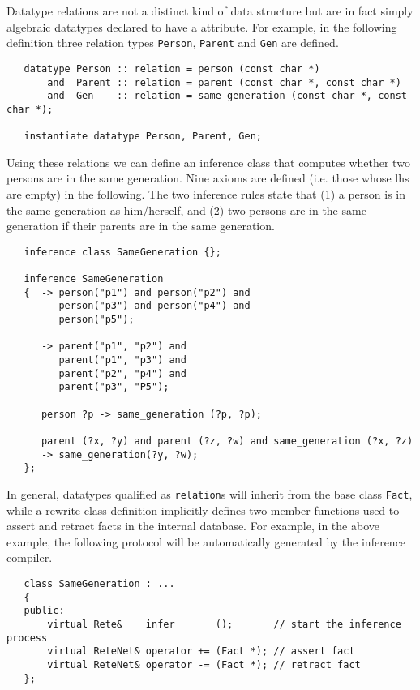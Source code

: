Datatype relations are not a distinct kind of data structure but are in fact
simply algebraic datatypes declared to have a  
attribute.  For example, in
the following definition three relation types \verb|Person|, \verb|Parent|
and \verb|Gen| are defined.
 
\begin{verbatim}
   datatype Person :: relation = person (const char *)
       and  Parent :: relation = parent (const char *, const char *)
       and  Gen    :: relation = same_generation (const char *, const char *);
 
   instantiate datatype Person, Parent, Gen;
\end{verbatim}
 
Using these relations we can define an inference class that computes whether
two persons are in the same generation.   Nine axioms are defined (i.e.
those whose lhs are empty) in the following.  The two inference rules
state that (1) a person is in the same generation as him/herself, 
and (2) two persons are in the same generation if 
their parents are in the same generation.
 
\begin{verbatim}
   inference class SameGeneration {};
 
   inference SameGeneration
   {  -> person("p1") and person("p2") and
         person("p3") and person("p4") and
         person("p5");
 
      -> parent("p1", "p2") and
         parent("p1", "p3") and
         parent("p2", "p4") and
         parent("p3", "P5");
 
      person ?p -> same_generation (?p, ?p);
 
      parent (?x, ?y) and parent (?z, ?w) and same_generation (?x, ?z)
      -> same_generation(?y, ?w);
   };
\end{verbatim}
 
In general, datatypes qualified as \verb|relation|s will inherit
from the base class \verb|Fact|, while a rewrite class definition
implicitly defines two member functions used to assert and retract facts
in the internal database.  For example, in the above example, the following
protocol will be automatically generated by the inference compiler.
 
\begin{verbatim}
   class SameGeneration : ...
   {
   public:
       virtual Rete&    infer       ();       // start the inference process
       virtual ReteNet& operator += (Fact *); // assert fact
       virtual ReteNet& operator -= (Fact *); // retract fact
   };
\end{verbatim}
 

